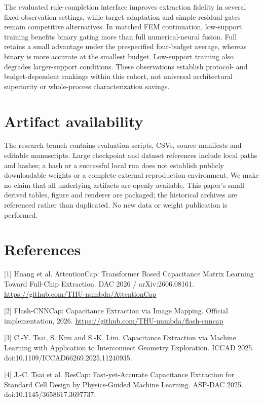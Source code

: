 \documentclass[10pt,twocolumn]{article}
\begin{document}
The evaluated rule-completion interface improves extraction fidelity in several fixed-observation settings, while target adaptation and simple residual gates remain competitive alternatives. In matched FEM continuation, low-support training benefits binary gating more than full numerical-neural fusion. Full retains a small advantage under the prespecified four-budget average, whereas binary is more accurate at the smallest budget. Low-support training also degrades larger-support conditions. These observations establish protocol- and budget-dependent rankings within this cohort, not universal architectural superiority or whole-process characterization savings.

\section*{Artifact availability}

The research branch contains evaluation scripts, CSVs, source manifests and editable manuscripts. Large checkpoint and dataset references include local paths and hashes; a hash or a successful local run does not establish publicly downloadable weights or a complete external reproduction environment. We make no claim that all underlying artifacts are openly available. This paper's small derived tables, figure and renderer are packaged; the historical archives are referenced rather than duplicated. No new data or weight publication is performed.

\clearpage
\section*{References}

[1] Huang et al. AttentionCap: Transformer Based Capacitance Matrix Learning Toward Full-Chip Extraction. DAC 2026 / arXiv:2606.08161. \url{https://github.com/THU-numbda/AttentionCap}

[2] Flash-CNNCap: Capacitance Extraction via Image Mapping. Official implementation, 2026. \url{https://github.com/THU-numbda/flash-cnncap}

[3] C.-Y. Tsai, S. Kim and S.-K. Lim. Capacitance Extraction via Machine Learning with Application to Interconnect Geometry Exploration. ICCAD 2025. doi:10.1109/ICCAD66269.2025.11240935.

[4] J.-C. Tsai et al. ResCap: Fast-yet-Accurate Capacitance Extraction for Standard Cell Design by Physics-Guided Machine Learning. ASP-DAC 2025. doi:10.1145/3658617.3697737.
\end{document}
